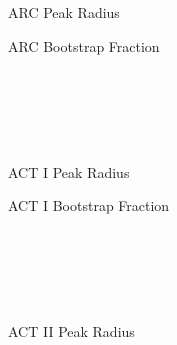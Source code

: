 \begin{figure*}
    \centering
    \hfill
    \begin{subfigure}[t]{0.45\textwidth}
        \centering
		\begin{adjustbox}{width=\textwidth}
			\Large
			
		\end{adjustbox}
        \caption{ARC Peak Radius}
    \end{subfigure}
    \hfill
    \begin{subfigure}[t]{0.45\textwidth}
        \centering
		\begin{adjustbox}{width=\textwidth}
			\Large
			
		\end{adjustbox}
        \caption{ARC Bootstrap Fraction}
    \end{subfigure}
    \hfill \hfill ~\\ ~\\ ~\\ ~\\
    \hfill
    \begin{subfigure}[t]{0.45\textwidth}
        \centering
		\begin{adjustbox}{width=\textwidth}
			\Large
			
		\end{adjustbox}
        \caption{ACT I Peak Radius}
    \end{subfigure}
    \hfill
    \begin{subfigure}[t]{0.45\textwidth}
        \centering
		\begin{adjustbox}{width=\textwidth}
			\Large
			
		\end{adjustbox}
        \caption{ACT I Bootstrap Fraction}
    \end{subfigure}
    \hfill \hfill ~\\ ~\\ ~\\ ~\\
    \hfill
    \begin{subfigure}[t]{0.45\textwidth}
        \centering
		\begin{adjustbox}{width=\textwidth}
			\Large
			
		\end{adjustbox}
        \caption{ACT II Peak Radius}
    \end{subfigure}
    \hfill
    \begin{subfigure}[t]{0.45\textwidth}
        \centering
		\begin{adjustbox}{width=\textwidth}

\end{adjustbox}
\end{subfigure}
\end{figure*}
